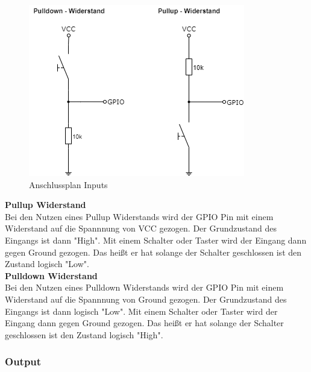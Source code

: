 \begin{figure}[H]
	\begin{center}
		\includegraphics[scale=0.8]{figures/hcis/input.png}
			\caption{Anschlussplan Inputs}
			\label{fig:input}
	\end{center}
\end{figure}

\textbf{Pullup Widerstand}\\
Bei den Nutzen eines Pullup Widerstands wird der GPIO Pin mit einem Widerstand auf die Spannnung von VCC gezogen. Der Grundzustand des Eingangs ist dann "High". Mit einem Schalter oder Taster wird der Eingang dann gegen Ground gezogen. Das heißt er hat solange der Schalter geschlossen ist den Zustand logisch "Low".\\\medskip
\textbf{Pulldown Widerstand}\\
Bei den Nutzen eines Pulldown Widerstands wird der GPIO Pin mit einem Widerstand auf die Spannnung von Ground gezogen. Der Grundzustand des Eingangs ist dann logisch "Low". Mit einem Schalter oder Taster wird der Eingang dann gegen Ground gezogen. Das heißt er hat solange der Schalter geschlossen ist den Zustand logisch "High".

\subsubsection{Output}


